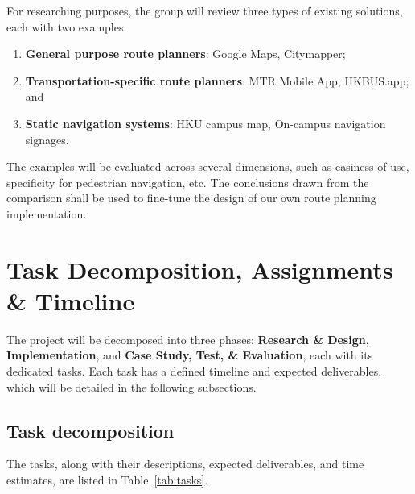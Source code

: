 \documentclass[a4paper,12pt]{amsart}
\begin{document}
For researching purposes, the group will review three types of existing solutions, each with two examples:
\begin{enumerate}
    \item \textbf{General purpose route planners}: Google Maps, Citymapper;
    \item \textbf{Transportation-specific route planners}: MTR Mobile App, HKBUS.app; and
    \item \textbf{Static navigation systems}: HKU campus map, On-campus navigation signages.
\end{enumerate}
The examples will be evaluated across several dimensions, such as easiness of use, specificity for pedestrian navigation, etc.
The conclusions drawn from the comparison shall be used to fine-tune the design of our own route planning implementation.

\section{Task Decomposition, Assignments \& Timeline}

The project will be decomposed into three phases: \textbf{Research \& Design}, \textbf{Implementation}, and \textbf{Case Study, Test, \& Evaluation}, each with its dedicated tasks.
Each task has a defined timeline and expected deliverables, which will be detailed in the following subsections.

\subsection{Task decomposition}
The tasks, along with their descriptions, expected deliverables, and time estimates, are listed in Table~\ref{tab:tasks}.
\end{document}
